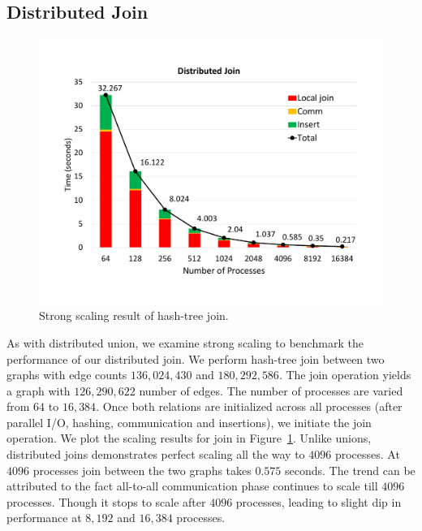 

\subsection{Distributed Join}
\label{sec:join}

\begin{figure}[h]
	\includegraphics[width=\columnwidth]{results/join_new_final.pdf}
	\caption{Strong scaling result of hash-tree join.}
	\label{fig:dist_join}
\end{figure}

As with distributed union, we examine strong scaling to benchmark the performance of our distributed join.
We perform hash-tree join between two graphs with edge counts $136,\!024,\!430$ and $180,\!292,\!586$. The join operation yields a graph with $126,\!290,\!622$ number of edges.
The number of processes are varied from $64$ to $16,384$. 
Once both relations are initialized across all processes (after parallel I/O, hashing, communication and insertions), we initiate the join operation. 
We plot the scaling results for join in Figure~\ref{fig:dist_join}.
Unlike unions, distributed joins demonstrates perfect scaling all the way to $4096$ processes. At $4096$ processes join between the two graphs takes $0.575$ seconds. The trend can be attributed to the fact all-to-all communication phase continues to scale till $4096$ processes.
Though it stops to scale after $4096$ processes, leading to slight dip in performance at $8,192$ and $16,384$ processes.


